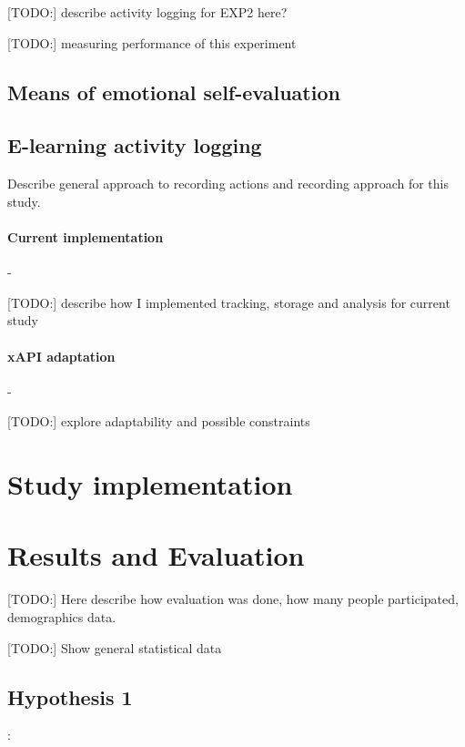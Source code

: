 		[TODO:] describe activity logging for EXP2 here?
		
		[TODO:] measuring performance of this experiment


	\subsection{Means of emotional self-evaluation} \label{'sec:selfeval'}
	
	


	\subsection{E-learning activity logging}
	
	
	
	Describe general approach to recording actions and recording approach for this study.
		
		\paragraph{Current implementation} -
		
		[TODO:] describe how I implemented tracking, storage and analysis for current study
		
		\paragraph{xAPI adaptation} - 
		
		[TODO:] explore adaptability and possible constraints

\section{Study implementation}



\section{Results and Evaluation}

[TODO:] Here describe how evaluation was done, how many people participated, demographics data.

[TODO:] Show general statistical data

	\subsection{Hypothesis 1}: 
	
